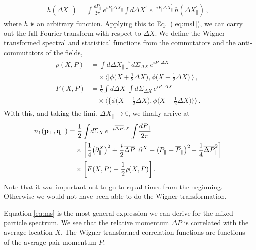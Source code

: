 \documentclass[reprint,superscriptaddress,english,preprintnumbers,amsmath,amssymb,aps,prx]{revtex4-2}
\def\Eq#1{Eq.~(\ref{#1})}
\begin{document}
\begin{align}
h(\Delta X_\parallel) = \int\!\frac{dP_\parallel}{2\pi}\, e^{iP_\parallel \Delta X_\parallel}\int\!d\Delta X_\parallel^\prime\, e^{-i P_\parallel \Delta X_\parallel^\prime}\,h(\Delta X_\parallel^\prime)\,,
\end{align}
where $h$ is an arbitrary function. Applying this to \Eq{eq:ms1}, we can carry out the full Fourier transform with respect to $\Delta X$. 
We define the Wigner-transformed spectral and statistical functions from the commutators and the anti-commutators of the fields,
\begin{align}\label{eq:rhof}
\begin{split}
\rho(X,P) &=\int\!d\Delta X_\parallel \int\!d\Sigma_{\Delta X}\, e^{iP \cdot \Delta X}\\
&\quad\times \bigg\langle\bigg[ \phi\bigg(X+\frac{1}{2} \Delta X\bigg),\phi\bigg(X-\frac{1}{2}\Delta X\bigg) \bigg]\bigg\rangle\,,
\\
F(X,P) &= \frac{1}{2}\int\!d\Delta X_\parallel \int\!d\Sigma_{\Delta X}\, e^{iP\cdot\Delta X}\\
&\quad\times\bigg\langle\bigg\{ \phi\bigg(X+\frac{1}{2} \Delta X\bigg),\phi\bigg(X-\frac{1}{2} \Delta X\bigg) \bigg\}\bigg\rangle\,.
\end{split}
\end{align}
With this, and taking the limit $\Delta X_\parallel \rightarrow 0$, we finally arrive at
\begin{align}\label{eq:ms}
\begin{split}
n_1(\bold{p}_\perp,\bold{q}_\perp)&= \frac{1}{2}\int\!d\Sigma_X\, e^{-i\overline{\Delta P}\cdot X} \int\! \frac{dP_\parallel}{2\pi}\\
&\quad\times \bigg[ 
\frac{1}{4}\big(\partial_{\parallel}^X\big)^2 + \frac{i}{2}\overline{\Delta P}_\parallel \partial_{\parallel}^X
+\big( P_\parallel + \overline{P}_\parallel \big)^2 - \frac{1}{4} \overline{\Delta P}_\parallel^2
 \bigg]\\
&\quad\times\bigg[ F(X,P) - \frac{1}{2}\rho(X,P) \bigg]\,.
\end{split}
\end{align}
Note that it was important not to go to equal times from the beginning. Otherwise we would not have been able to do the Wigner transformation.

Equation \eqref{eq:ms} is the most general expression we can derive for the mixed particle spectrum. We see that the relative momentum $\overline{\Delta P}$ is correlated with the average location $X$. The Wigner-transformed correlation functions are functions of the average pair momentum $P$.
\end{document}
